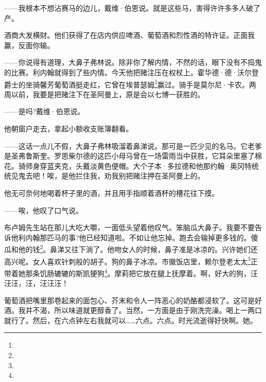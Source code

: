 \par ——我根本不想沾赛马的边儿，戴维·伯恩说。就是这些马，害得许许多多人破了产。
\par 酒商大发横财。他们获得了在店内供应啤酒、葡萄酒和烈性酒的特许证。正面我赢，反面你输。
\par ——你说得有道理，大鼻子弗林说。除非你了解内情，不然的话，眼下没有不捣鬼的比赛。利内翰就得到了些内情。今天他把赌注压在权杖上。霍华德·德·沃尔登爵士的坐骑馨芳葡萄酒挺走红，它曾在埃普瑟姆\footnote{}赢过。骑手是莫尔尼·卡农。两周以前，我要是把赌注下在圣阿曼上，原是会以七博一获胜的。
\par ——是吗?戴维·伯恩说。
\par 他朝窗户走去，拿起小额收支账簿翻看。
\par ——这话一点儿不假，大鼻子弗林吸溜着鼻涕说。那可是一匹少见的名马。它老爹是圣弗鲁斯奎。罗思柴尔德的这匹小母马曾在一场雷雨当中获胜，它耳朵里塞了棉花。骑师身穿蓝夹克，头戴淡黄色便帽。大个子本·多拉德和他那约翰·奥冈特统统见鬼去吧！唉，是他拦住我，劝我别把赌注押在圣阿曼上的。
\par 他无可奈何地喝着杯子里的酒，并且用手指顺着酒杯的槽花往下摸。
\par ——唉，他叹了口气说。
\par 布卢姆先生站在那儿大吃大嚼，一面低头望着他叹气。笨脑瓜大鼻子。我要不要告诉他利内翰那匹马的事?他已经知道啦。不如让他忘掉。跑去会输掉更多钱的。傻瓜和他的钱\footnote{}。鼻涕又往下淌了。他吻女人的时候，鼻子准是冰凉的。兴许她们还高兴呢。女人喜欢针刺般的胡子。狗的鼻子冰凉。市徽饭店里，赖尔登老太太\footnote{}正带着她那条饥肠辘辘的斯凯㹴狗\footnote{}。摩莉把它放在腿上抚摩着。啊，好大的狗，汪汪汪，汪，汪汪汪！
\par 葡萄酒把嘴里那卷起来的面包心、芥末和令人一阵恶心的奶酪都浸软了。这可是好酒。我并不渴，所以味道就更醇香了。当然，一方面是由于刚洗完澡。喝上一两口就行了。然后，在六点钟左右我就可以……六点。六点。时光流逝得好快啊。她。
